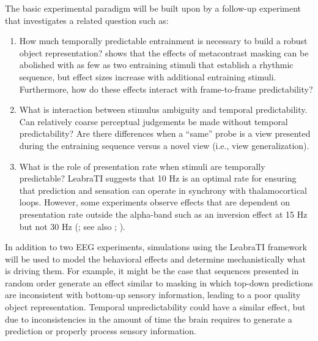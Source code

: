 \documentclass[12pt]{article}
\begin{document}
The basic experimental paradigm will be built upon by a follow-up experiment that investigates a related question such as:
\begin{enumerate}
\item How much temporally predictable entrainment is necessary to build a robust object representation?  shows that the effects of metacontrast masking can be abolished with as few as two entraining stimuli that establish a rhythmic sequence, but effect sizes increase with additional entraining stimuli. Furthermore, how do these effects interact with frame-to-frame predictability?
\item What is interaction between stimulus ambiguity and temporal predictability. Can relatively coarse perceptual judgements be made without temporal predictability? Are there differences when a ``same'' probe is a view presented during the entraining sequence versus a novel view (i.e., view generalization).
\item What is the role of presentation rate when stimuli are temporally predictable? LeabraTI suggests that 10 Hz is an optimal rate for ensuring that prediction and sensation can operate in synchrony with thalamocortical loops. However, some experiments observe effects that are dependent on presentation rate outside the alpha-band such as an inversion effect at 15 Hz but not 30 Hz (; see also ; ).
\end{enumerate}

In addition to two EEG experiments, simulations using the LeabraTI framework will be used to model the behavioral effects and determine mechanistically what is driving them. For example, it might be the case that sequences presented in random order generate an effect similar to masking in which top-down predictions are inconsistent with bottom-up sensory information, leading to a poor quality object representation. Temporal unpredictability could have a similar effect, but due to inconsistencies in the amount of time the brain requires to generate a prediction or properly process sensory information.



\end{document}
